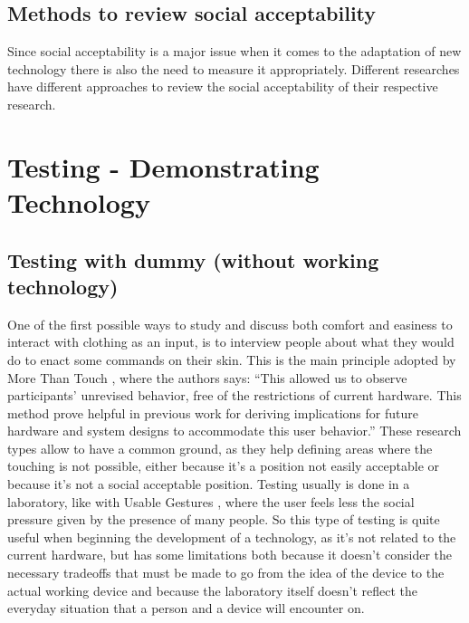 \documentclass{sigchi}
\begin{document}
\subsection{Methods to review social acceptability}
%

Since social acceptability is a major issue when it comes to the adaptation of new technology there is also the need to measure it appropriately. Different researches have different approaches to review the social acceptability of their respective research. \cite{touch-wrist}

\section{Testing - Demonstrating Technology}

\subsection{Testing with dummy (without working technology)}
One of the first possible ways to study and discuss both comfort and easiness  to interact with clothing as an input, is to interview people about what they would do to enact some commands on their skin. This is the main principle adopted by More Than Touch \cite[p. 181]{more-touch}, where the authors says: “This allowed us to observe participants’ unrevised behavior, free of the restrictions of current hardware. This method prove helpful in previous work for deriving implications for future hardware and system designs to accommodate this user behavior.”
These research types allow to have a common ground, as they help defining areas where the touching is not possible, either because it’s a position not easily acceptable or because it’s not a social acceptable position. Testing usually is done in a laboratory, like with Usable Gestures \cite{usable-gesture}, where the user feels less the social pressure given by the presence of many people. So this type of testing is quite useful when beginning the development of a technology, as it’s not related to the current hardware, but has some limitations both because it doesn’t consider the necessary tradeoffs that must be made to go from the idea of the device to the actual working device and because the laboratory itself doesn’t reflect the everyday situation that a person and a device will encounter on.
\end{document}
